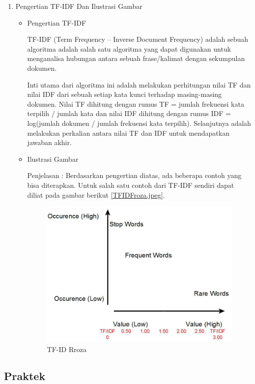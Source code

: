\begin{enumerate}
\item Pengertian TF-IDF Dan Ilustrasi Gambar
\begin{itemize}
\item  Pengertian TF-IDF
\par TF-IDF  (Term Frequency – Inverse Document Frequency) adalah  sebuah algoritma  adalah salah satu algoritma yang dapat digunakan untuk menganalisa hubungan antara sebuah frase/kalimat dengan sekumpulan dokumen. 
\par Inti utama dari algoritma ini adalah melakukan perhitungan nilai TF dan nilai IDF dari sebuah setiap kata kunci terhadap masing-masing dokumen. Nilai TF dihitung dengan rumus TF = jumlah frekuensi kata terpilih / jumlah kata dan nilai IDF dihitung dengan rumus IDF = log(jumlah dokumen / jumlah frekuensi kata terpilih). Selanjutnya adalah melakukan perkalian antara nilai TF dan IDF untuk mendapatkan jawaban akhir.
\item Ilustrasi Gambar
\par Penjelasan : Berdasarkan pengertian diatas, ada beberapa contoh yang bisa diterapkan. Untuk salah satu contoh dari TF-IDF sendiri dapat diliat pada gambar berikut \ref{TFIDFroza.jpeg}.
\begin{figure}[!hbtp]
\centering
\includegraphics[scale=0.2]{figures/TFIDFroza.jpeg}
\caption{TF-ID Rroza}
\label{tf-fadila}
\end{figure}
\par
\end{itemize}
\par
\par

\end{enumerate}

\subsection{Praktek}